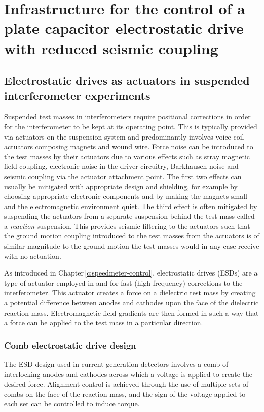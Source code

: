 \chapter{\label{c:esd-concept}Infrastructure for the control of a plate capacitor electrostatic drive with reduced seismic coupling}

\section{Electrostatic drives as actuators in suspended interferometer experiments}
Suspended test masses in interferometers require positional corrections in order for the interferometer to be kept at its operating point. This is typically provided via actuators on the suspension system and predominantly involves voice coil actuators composing magnets and wound wire. Force noise can be introduced to the test masses by their actuators due to various effects such as stray magnetic field coupling, electronic noise in the driver circuitry, Barkhausen noise \cite{Weiss2008} and seismic coupling via the actuator attachment point. The first two effects can usually be mitigated with appropriate design and shielding, for example by choosing appropriate electronic components and by making the magnets small and the electromagnetic environment quiet. The third effect is often mitigated by suspending the actuators from a separate suspension behind the test mass called a \emph{reaction} suspension. This provides seismic filtering to the actuators such that the ground motion coupling introduced to the test masses from the actuators is of similar magnitude to the ground motion the test masses would in any case receive with no actuation.

As introduced in Chapter\,\ref{c:speedmeter-control}, electrostatic drives (\glspl{ESD}) are a type of actuator employed in \GEO{} and \ALIGO{} for fast (high frequency) corrections to the interferometer. This actuator creates a force on a dielectric test mass by creating a potential difference between anodes and cathodes upon the face of the dielectric reaction mass. Electromagnetic field gradients are then formed in such a way that a force can be applied to the test mass in a particular direction.

\subsection{Comb electrostatic drive design}
The \gls{ESD} design used in current generation detectors involves a comb of interlocking anodes and cathodes across which a voltage is applied to create the desired force. Alignment control is achieved through the use of multiple sets of combs on the face of the reaction mass, and the sign of the voltage applied to each set can be controlled to induce torque.

